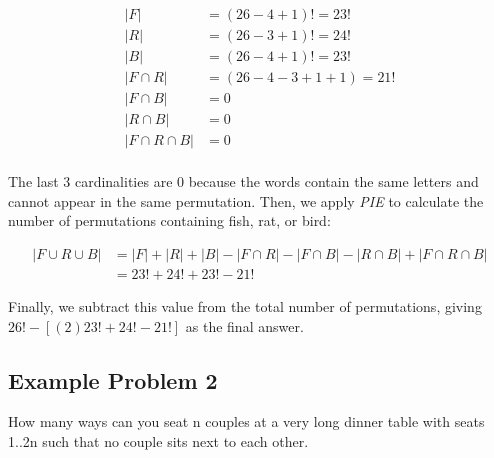 \documentclass{article}
\begin{document}
\begin{equation*}
\begin{split}
|F| &= (26 - 4 + 1)! = 23! \\
|R| &= (26 - 3 + 1)! = 24! \\
|B| &= (26 - 4 + 1)! = 23! \\
|F \cap R| &= (26 - 4 - 3 + 1 + 1) = 21! \\
|F \cap B| &= 0 \\
|R \cap B| &= 0 \\
|F \cap R \cap B| &= 0 \\
\end{split}
\end{equation*}

The last $3$ cardinalities are $0$ because the words contain 
the same letters and cannot appear in the same permutation. 
Then, we apply \textit{PIE} to calculate the number 
of permutations containing fish, rat, or bird:

\begin{equation*}
\begin{split}
|F \cup R \cup B| &= |F| + |R| + |B| - 
|F \cap R| - |F \cap B| - |R \cap B| 
+ |F \cap R \cap B| \\
&= 23! + 24! + 23! - 21!
\end{split}
\end{equation*}

Finally, we subtract this value from the total number 
of permutations, giving $ 26! - \left[ (2)23! + 24! - 21! \right] $ as the final answer.

\subsection{Example Problem 2}

How many ways can you seat n couples at a very 
long dinner table with seats 1..2n such that no 
couple sits next to each other.
\end{document}
